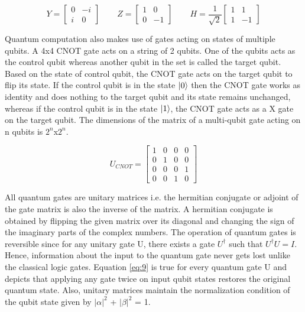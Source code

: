 \documentclass[english,a4paper,11pt,oneside,onecolumn]{book}
\begin{document}
\begin{equation}\label{eq:7}
Y = 
\begin{bmatrix}
0 & -i\\
i & 0
\end{bmatrix}
\hspace{25pt}
Z = 
\begin{bmatrix}
1 & 0\\
0 & -1
\end{bmatrix}
\hspace{25pt}
H = \dfrac{1}{\sqrt{2}}
\begin{bmatrix}
1 & 1\\
1 & -1
\end{bmatrix}
\end{equation}

Quantum computation also makes use of gates acting on states of multiple qubits. A 4x4 CNOT gate acts on a string of 2 qubits. One of the qubits acts as the control qubit whereas another qubit in the set is called the target qubit. Based on the state of control qubit, the CNOT gate acts on the target qubit to flip its state. If the control qubit is in the state \(\ket{0}\) then the CNOT gate works as identity and does nothing to the target qubit and its state remains unchanged, whereas if the control qubit is in the state \(\ket{1}\), the CNOT gate acts as a X gate on the target qubit. The dimensions of the matrix of a multi-qubit gate acting on n qubits is \(2^n\)x\(2^n\).

\begin{equation}\label{eq:8}
U_{CNOT} = 
\begin{bmatrix}
1 & 0 & 0 & 0\\
0 & 1 & 0 & 0\\
0 & 0 & 0 & 1\\
0 & 0 & 1 & 0
\end{bmatrix}
\end{equation}

All quantum gates are unitary matrices i.e. the hermitian conjugate or adjoint of the gate matrix is also the inverse of the matrix. A hermitian conjugate is obtained by flipping the given matrix over its diagonal and changing the sign of the imaginary parts of the complex numbers. The operation of quantum gates is reversible since for any unitary gate U, there exists a gate \(U^{\dagger}\) such that \(U^{\dagger} U = I\). Hence, information about the input to the quantum gate never gets lost unlike the classical logic gates. Equation \ref{eq:9} is true for every quantum gate U and depicts that applying any gate twice on input qubit states restores the original quantum state. Also, unitary matrices maintain the normalization condition of the qubit state given by \(|\alpha|^2\) + \(|\beta|^2\) = 1.
\end{document}
